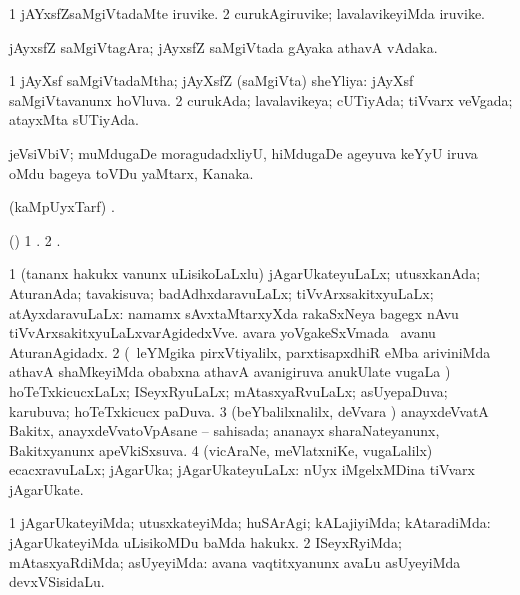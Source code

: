 \bentry
{}
\gl{\nA}
\bmng
\bnum
\num{1} jAYxsfZsaMgiVtadaMte iruvike. 
\num{2} curukAgiruvike; lavalavikeyiMda iruvike. 
\enum
\emng
\eentry

\bentry
{}
\gl{\nA}
\bmng
jAyxsfZ saMgiVtagAra; jAyxsfZ saMgiVtada gAyaka athavA vAdaka. 
\emng
\eentry

\bentry
{}
\gl{\gu}
\bmng
\bnum
\num{1} jAyXsf saMgiVtadaMtha; jAyXsfZ (saMgiVta) sheYliya: jAyXsf saMgiVtavanunx hoVluva. 
\num{2} curukAda; lavalavikeya; cUTiyAda; tiVvarx veVgada; atayxMta sUTiyAda. 
\enum
\emng
\eentry

\bentry
{}
\gl{\nA}
\expl{\P}
\bmng
jeVsiVbiV; muMdugaDe moragudadxliyU, hiMdugaDe ageyuva keYyU iruva oMdu bageya toVDu yaMtarx, Kanaka. 
\emng
\eentry

\bentry
{}
\gl{\saMkiSx}
\bmng
(kaMpUyxTarf) . 
\emng
\eentry

\bentry
{}
\gl{\saMkiSx}
\bmng
(\birx) 
\bnum
\num{1} . 
\num{2} . 
\enum
\emng
\eentry

\bentry
{}
\gl{\gu}
\bmng
\bnum
\num{1} (tananx hakukx \mo vanunx uLisikoLaLxlu) jAgarUkateyuLaLx; utusxkanAda; AturanAda; tavakisuva; badAdhxdaravuLaLx; tiVvArxsakitxyuLaLx; atAyxdaravuLaLx:  namamx sAvxtaMtarxyXda rakaSxNeya bagegx nAvu tiVvArxsakitxyuLaLxvarAgidedxVve.  avara yoVgakeSxVmada \vi\ avanu AturanAgidadx. 
\num{2} (\kanmu\ leYMgika pirxVtiyalilx, parxtisapxdhiR eMba ariviniMda athavA shaMkeyiMda obabxna athavA avanigiruva anukUlate \mo vugaLa \vi) hoTeTxkicucxLaLx; ISeyxRyuLaLx; mAtasxyaRvuLaLx; asUyepaDuva; karubuva; hoTeTxkicucx paDuva. 
\num{3} (beYbalilxnalilx, deVvara \vi) anayxdeVvatA Bakitx, anayxdeVvatoVpAsane -- sahisada; ananayx sharaNateyanunx, Bakitxyanunx apeVkiSxsuva. 
\num{4} (vicAraNe, meVlatxniKe, \mo vugaLalilx) ecacxravuLaLx; jAgarUka; jAgarUkateyuLaLx:  nUyx iMgelxMDina tiVvarx jAgarUkate. 
\enum
\emng
\eentry

\bentry
{}
\gl{\kirxvi}
\bmng
\bnum
\num{1} jAgarUkateyiMda; utusxkateyiMda; huSArAgi; kALajiyiMda; kAtaradiMda:  jAgarUkateyiMda uLisikoMDu baMda hakukx. 
\num{2} ISeyxRyiMda; mAtasxyaRdiMda; asUyeyiMda:  avana vaqtitxyanunx avaLu asUyeyiMda devxVSisidaLu. 
\enum
\emng
\eentry

